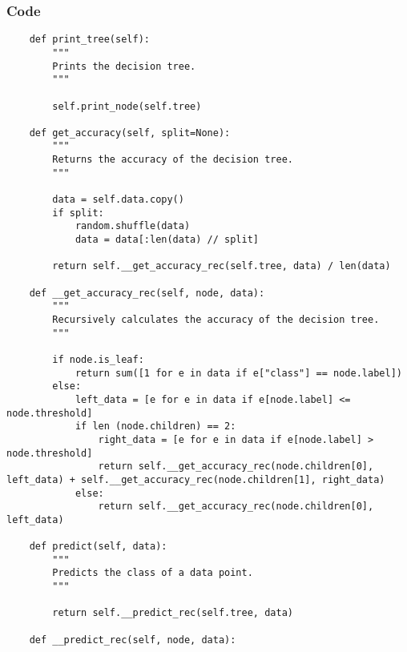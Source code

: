 \documentclass{beamer}
\begin{document}
\begin{frame}[fragile]
    \frametitle{Code}
    \fontsize{3pt}{5pt}\selectfont
    \begin{verbatim}
    def print_tree(self):
        """
        Prints the decision tree.
        """
        
        self.print_node(self.tree)

    def get_accuracy(self, split=None):
        """
        Returns the accuracy of the decision tree.
        """
                
        data = self.data.copy()
        if split:
            random.shuffle(data)
            data = data[:len(data) // split]

        return self.__get_accuracy_rec(self.tree, data) / len(data)
    
    def __get_accuracy_rec(self, node, data):
        """
        Recursively calculates the accuracy of the decision tree.
        """

        if node.is_leaf:
            return sum([1 for e in data if e["class"] == node.label])
        else:
            left_data = [e for e in data if e[node.label] <= node.threshold]
            if len (node.children) == 2:
                right_data = [e for e in data if e[node.label] > node.threshold]
                return self.__get_accuracy_rec(node.children[0], left_data) + self.__get_accuracy_rec(node.children[1], right_data)
            else:
                return self.__get_accuracy_rec(node.children[0], left_data)
        
    def predict(self, data):
        """
        Predicts the class of a data point.
        """

        return self.__predict_rec(self.tree, data)
    
    def __predict_rec(self, node, data):
    \end{verbatim}
\end{frame}
\end{document}
